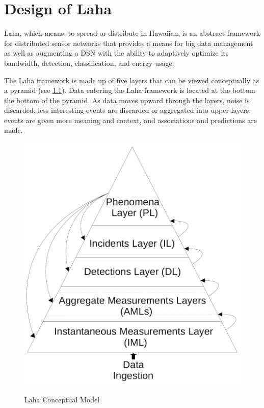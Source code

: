 \chapter{Design of Laha}

Laha, which means, to spread or distribute in Hawaiian, is an abstract framework for distributed sensor networks that provides a means for big data management as well as augmenting a DSN with the ability to adaptively optimize its bandwidth, detection, classification, and energy usage.

The Laha framework is made up of five layers that can be viewed conceptually as a pyramid (see \ref{laha-figure}). Data entering the Laha framework is located at the bottom the bottom of the pyramid. As data moves upward through the layers, noise is discarded, less interesting events are discarded or aggregated into upper layers, events are given more meaning and context, and associations and predictions are made. 

\begin{figure}
\caption{Laha Conceptual Model}
\centering
\includegraphics{figures/laha.png}	
\label{laha-figure}
\end{figure}

